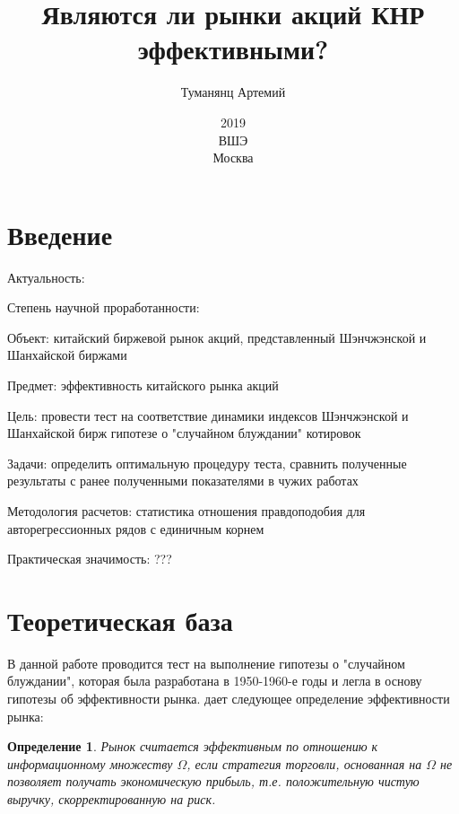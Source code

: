 \documentclass[a4paper,12pt]{article}
\title{Являются ли рынки акций КНР эффективными?}
\author{Туманянц Артемий}
\date{2019\\ВШЭ\\Москва}
\newtheorem{definition}{Определение}
\begin{document}
\maketitle
\newpage
\tableofcontents
\newpage
\section{Введение}

Актуальность:

Степень научной проработанности:

Объект: китайский биржевой рынок акций, представленный Шэнчжэнской и Шанхайской биржами

Предмет: эффективность китайского рынка акций

Цель: провести тест на соответствие динамики индексов Шэнчжэнской и Шанхайской бирж гипотезе о "случайном блуждании" котировок

Задачи: определить оптимальную процедуру теста, сравнить полученные результаты с ранее полученными показателями в чужих работах

Методология расчетов: статистика отношения правдоподобия для авторегрессионных рядов с единичным корнем

Практическая значимость: ???
\newpage
\section{Теоретическая база}

В данной работе проводится тест на выполнение гипотезы о "случайном блуждании", которая была разработана в 1950-1960-е годы и легла в основу гипотезы об эффективности рынка. \cite{Jensen1978} дает следующее определение эффективности рынка:

\begin{definition}
  Рынок считается эффективным по отношению к информационному множеству $\Omega$, если стратегия торговли, основанная на $\Omega$ не позволяет получать экономическую прибыль, т.е. положительную чистую выручку, скорректированную на риск.
\end{definition}
\end{document}
